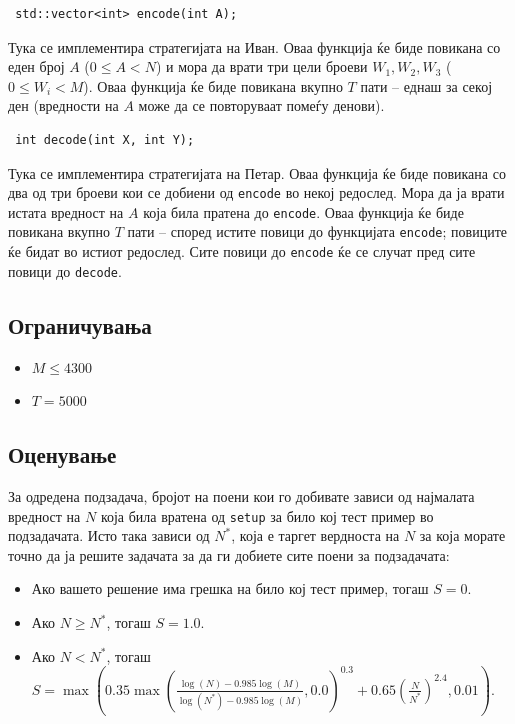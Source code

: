 \documentclass[12pt]{article}
\begin{document}
\begin{lstlisting}
 std::vector<int> encode(int A);
\end{lstlisting}

Тука се имплементира стратегијата на Иван. Оваа функција ќе биде повикана со еден број $A$ ($0 \leq A < N$) и мора да врати три цели броеви $W_1, W_2, W_3$ ($0 \leq W_i < M$). Оваа функција ќе биде повикана вкупно $T$ пати -- еднаш за секој ден (вредности на $A$ може да се повторуваат помеѓу денови).


                                                        
\begin{lstlisting}
 int decode(int X, int Y);
\end{lstlisting}

Тука се имплементира стратегијата на Петар. Оваа функција ќе биде повикана со два од три броеви кои се добиени од \texttt{encode} во некој редослед. Мора да ја врати истата вредност на $A$ која била пратена до \texttt{encode}. Оваа функција ќе биде повикана вкупно $T$ пати -- според истите повици до функцијата \texttt{encode}; повиците ќе бидат во истиот редослед. Сите повици до \texttt{encode} ќе се случат пред сите повици до \texttt{decode}.

\subsection{Ограничувања}

\begin{itemize}
\item $M \leq 4300$
\item $T = 5000$
\end{itemize}

\subsection{Оценување}

За одредена подзадача, бројот на поени кои го добивате зависи од најмалата вредност на $N$ која била вратена од \texttt{setup} за било кој тест пример во подзадачата. Исто така зависи од $N^*$, која е таргет вердноста на $N$ за која морате точно да ја решите задачата за да ги добиете сите поени за подзадачата:

\begin{itemize}
\item Ако вашето решение има грешка на било кој тест пример, тогаш $S = 0$.
\item Ако $N \geq N^*$, тогаш $S = 1.0$.
\item Ако $N < N^*$, тогаш $S = \max\left(0.35 \max\left(\frac{\log(N) - 0.985 \log(M)}{\log(N^*) - 0.985 \log(M)}, 0.0\right)^{0.3} + 0.65 \left(\frac{N}{N^*}\right)^{2.4}, 0.01\right)$.
\end{itemize}
\end{document}
